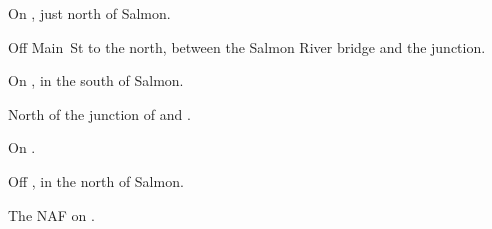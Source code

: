 
\begin{LocationList}

On , just north of Salmon.

Off  Main~St to the north, between the Salmon River bridge and the  junction.

On , in the south of Salmon.

North of the junction of  and .

On .

\Location{\GarageHQ \Garage}
Off , in the north of Salmon.

\Location{\GasStation \Gas \Rest}
The NAF on .

\end{LocationList}
